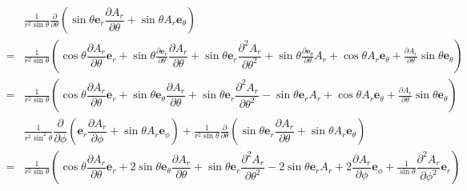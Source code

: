 \begin{align*}
&\frac{1}{r^2\sin\theta}\frac{\partial}{\partial \theta}\left(\sin\theta\boldsymbol{e}_r\dfrac{{\partial A_r}}{\partial \theta}
+\sin\theta A_r\boldsymbol{e}_\theta\right)\\
=&\frac{1}{r^2\sin\theta}\left(\cos\theta\dfrac{{\partial A_r}}{\partial \theta}\boldsymbol{e}_r
+\sin\theta\frac{\partial\boldsymbol{e}_r}{\partial \theta}\dfrac{{\partial A_r}}{\partial \theta}
+\sin\theta\boldsymbol{e}_r\dfrac{{\partial^2 A_r}}{\partial \theta^2}
+\sin\theta\frac{\partial \boldsymbol{e}_\theta}{\partial \theta}A_r
+\cos\theta A_r\boldsymbol{e}_\theta
+\frac{\partial A_r}{\partial \theta}\sin\theta \boldsymbol{e}_\theta\right)\\
=&\frac{1}{r^2\sin\theta}\left(\cos\theta\dfrac{{\partial A_r}}{\partial \theta}\boldsymbol{e}_r
+\sin\theta\boldsymbol{e}_\theta\dfrac{{\partial A_r}}{\partial \theta}
+\sin\theta\boldsymbol{e}_r\dfrac{{\partial^2 A_r}}{\partial \theta^2}
-\sin\theta\boldsymbol{e}_rA_r
+\cos\theta A_r\boldsymbol{e}_\theta
+\frac{\partial A_r}{\partial \theta}\sin\theta \boldsymbol{e}_\theta\right)
\end{align*}
\begin{align*}
    &\frac{1}{r^2\sin^2\theta}\dfrac{{\partial}}{\partial \phi}\left(\boldsymbol{e}_r\dfrac{{\partial A_r}}{\partial \phi}
+\sin\theta A_r\boldsymbol{e}_\phi\right)
+\frac{1}{r^2\sin\theta}\frac{\partial}{\partial \theta}\left(\sin\theta\boldsymbol{e}_r\dfrac{{\partial A_r}}{\partial \theta}
+\sin\theta A_r\boldsymbol{e}_\theta\right)\nonumber\\
=&\frac{1}{r^2\sin\theta}\left(\cos\theta\dfrac{{\partial A_r}}{\partial \theta}\boldsymbol{e}_r
+2\sin\theta\boldsymbol{e}_\theta\dfrac{{\partial A_r}}{\partial \theta}
+\sin\theta\boldsymbol{e}_r\dfrac{{\partial^2 A_r}}{\partial \theta^2}
-2\sin\theta\boldsymbol{e}_rA_r
+2\dfrac{{\partial A_r}}{\partial \phi}\boldsymbol{e}_\phi
+\frac{1}{\sin\theta}\dfrac{{\partial^2 A_r}}{\partial \phi^2}\boldsymbol{e}_r\right)
\end{align*}

